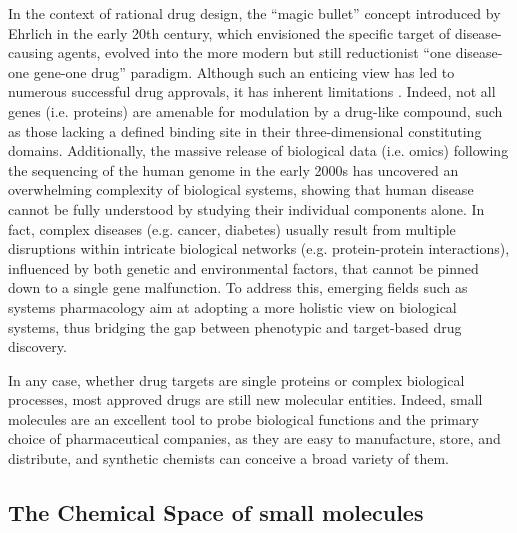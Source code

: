 In the context of rational drug design, the “magic bullet” concept introduced by Ehrlich in the early 20th century, which envisioned the specific target of disease-causing agents, evolved into the more modern but still reductionist “one disease-one gene-one drug” paradigm. Although such an enticing view has led to numerous successful drug approvals, it has inherent limitations \cite{samsdodd_target-based_2005, swinney_how_2011}. Indeed, not all genes (i.e. proteins) are amenable for modulation by a drug-like compound, such as those lacking a defined binding site in their three-dimensional constituting domains. Additionally, the massive release of biological data (i.e. omics) following the sequencing of the human genome in the early 2000s \cite{venter_sequence_2001, international_human_genome_sequencing_consortium_initial_2001, field_omics_2009, mardis_decades_2011} has uncovered an overwhelming complexity of biological systems\cite{kitano_systems_2002}, showing that human disease cannot be fully understood by studying their individual components alone. In fact, complex diseases (e.g. cancer, diabetes) usually result from multiple disruptions within intricate biological networks (e.g. protein-protein interactions), influenced by both genetic and environmental factors, that cannot be pinned down to a single gene malfunction. To address this, emerging fields such as systems pharmacology aim at adopting a more holistic view on biological systems, thus bridging the gap between phenotypic and target-based drug discovery.

In any case, whether drug targets are single proteins or complex biological processes, most approved drugs are still new molecular entities\cite{mullard_2023_2024}. Indeed, small molecules are an excellent tool to probe biological functions and the primary choice of pharmaceutical companies, as they are easy to manufacture, store, and distribute, and synthetic chemists can conceive a broad variety of them.

\subsection{The Chemical Space of small molecules}
\label{Introduction_chemicalspace}


